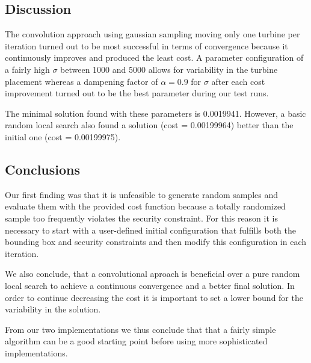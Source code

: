 \documentclass{article}
\begin{document}
\subsection{Discussion}

The convolution approach using gaussian sampling moving only one turbine per iteration turned out to be most successful in terms of convergence because it continuously improves and produced the least cost. A parameter configuration of a fairly high $\sigma$ between 1000 and 5000 allows for variability in the turbine placement whereas a dampening factor of $\alpha=0.9$ for $\sigma$ after each cost improvement turned out to be the best parameter during our test runs.

The minimal solution found with these parameters is 0.0019941. However, a basic random local search also found a solution (cost = 0.00199964) better than the initial one (cost = 0.00199975).

\subsection{Conclusions}
Our first finding was that it is unfeasible to generate random samples and evaluate them with the provided cost function because a totally randomized sample too frequently violates the security constraint.
For this reason it is necessary to start with a user-defined initial configuration that fulfills both the bounding box and security constraints and then modify this configuration in each iteration.

We also conclude, that a convolutional aproach is beneficial over a pure random local search to achieve a continuous convergence and a better final solution. In order to continue decreasing the cost it is important to set a lower bound for the variability in the solution.

From our two implementations we thus conclude that that a fairly simple algorithm can be a good starting point before using more sophisticated implementations.


\end{document}
